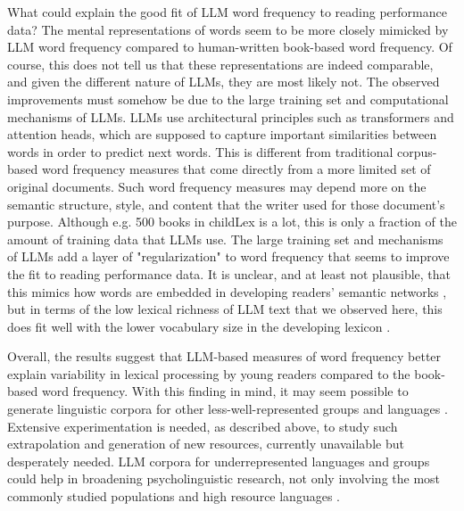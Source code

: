 \documentclass[doc, a4paper]{apa7}
\begin{document}
What could explain the good fit of LLM word frequency to reading performance data? The mental representations of words seem to be more closely mimicked by LLM word frequency compared to human-written book-based word frequency. Of course, this does not tell us that these representations are indeed comparable, and given the different nature of LLMs, they are most likely not. The observed improvements must somehow be due to the large training set and computational mechanisms of LLMs. LLMs use architectural principles such as transformers and attention heads, which are supposed to capture important similarities between words in order to predict next words. This is different from traditional corpus-based word frequency measures that come directly from a more limited set of original documents. Such word frequency measures may depend more on the semantic structure, style, and content that the writer used for those document's purpose. Although e.g. 500 books in childLex is a lot, this is only a fraction of the amount of training data that LLMs use. The large training set and mechanisms of LLMs add a layer of "regularization" to word frequency that seems to improve the fit to reading performance data. It is unclear, and at least not plausible, that this mimics how words are embedded in developing readers' semantic networks \citep{frank_bridging_2023}, but in terms of the low lexical richness of LLM text that we observed here, this does fit well with the lower vocabulary size in the developing lexicon \citep{keuleers_word_2015}. 

Overall, the results suggest that LLM-based measures of word frequency better explain variability in lexical processing by young readers compared to the book-based word frequency. With this finding in mind, it may seem possible to generate linguistic corpora for other less-well-represented groups and languages \citep[][]{gagl_eye_2022, blasi_over-reliance_2022}. Extensive experimentation is needed, as described above, to study such extrapolation and generation of new resources, currently unavailable but desperately needed. LLM corpora for underrepresented languages and groups could help in broadening psycholinguistic research, not only involving the most commonly studied populations and high resource languages \citep{henrich_weirdest_2010, blasi_over-reliance_2022}. 
\end{document}
